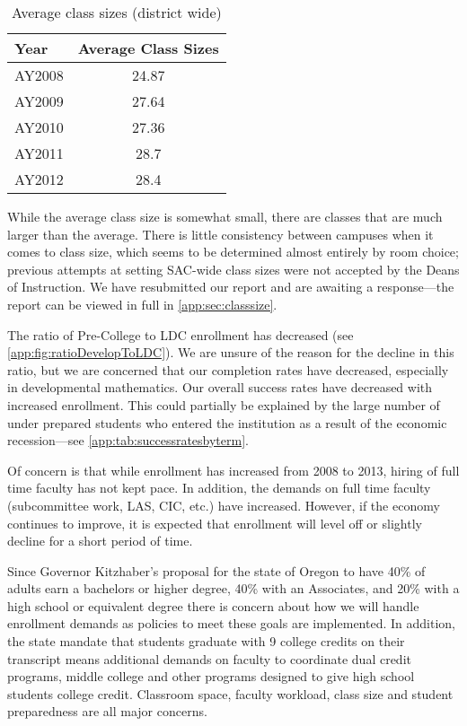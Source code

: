 \begin{table}[!htb]
	\centering
	\caption{Average class sizes (district wide)}
	\label{needs:tab:averageclasssize}
	\begin{tabular}{lS[table-format=2.2]}
		\toprule
		Year   & {Average Class Sizes } \\
		\midrule
		AY2008 & 24.87                  \\
		AY2009 & 27.64                  \\
		AY2010 & 27.36                  \\
		AY2011 & 28.7                   \\
		AY2012 & 28.4                   \\
		\bottomrule
	\end{tabular}
\end{table}

While the average class size is somewhat small, there are classes that are much
larger than the average. There is little consistency between campuses when it
comes to class size, which seems to be determined almost entirely by room
choice; previous attempts at setting SAC-wide class sizes were not accepted by
the Deans of Instruction. We have resubmitted our report and are awaiting a
response---the report \label{needs:page:classsize} can be viewed in full in \vref{app:sec:classsize}.

The ratio of Pre-College to LDC enrollment has decreased (see
\vref{app:fig:ratioDevelopToLDC}). We are unsure of the reason for the decline
in this ratio, but we are concerned that our completion rates have decreased,
especially in developmental mathematics. Our overall success rates have
decreased with increased enrollment.  This could partially be explained by the
large number of under prepared students who entered the institution as a result
of the economic recession---see \vref{app:tab:successratesbyterm}.

Of concern is that while enrollment has increased from 2008 to 2013, hiring of
full time faculty has not kept pace. In addition, the demands on full time
faculty (subcommittee work, LAS, CIC,  etc.) have increased.   However,
if the economy continues to improve, it is expected that enrollment will level
off or slightly decline for a short period of time.

Since Governor Kitzhaber's proposal for the state of Oregon to have 40\% of
adults earn a bachelors or higher degree, 40\% with an Associates, and 20\%
with a high school or equivalent degree there is concern about how we will handle
enrollment demands as policies to meet these goals are implemented. In addition, the state mandate that students graduate with 9 college credits on their transcript means additional demands on faculty to coordinate dual credit programs, middle college and other programs designed to give high school students college credit. Classroom space, faculty workload, class size and student preparedness are all
major concerns.


